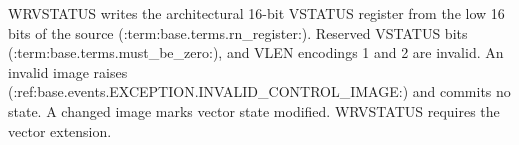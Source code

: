 WRVSTATUS writes the architectural 16-bit VSTATUS register from the low 16 bits of the source (:term:base.terms.rn_register:). Reserved VSTATUS bits (:term:base.terms.must_be_zero:), and VLEN encodings 1 and 2 are invalid. An invalid image raises (:ref:base.events.EXCEPTION.INVALID_CONTROL_IMAGE:) and commits no state. A changed image marks vector state modified. WRVSTATUS requires the vector extension.
